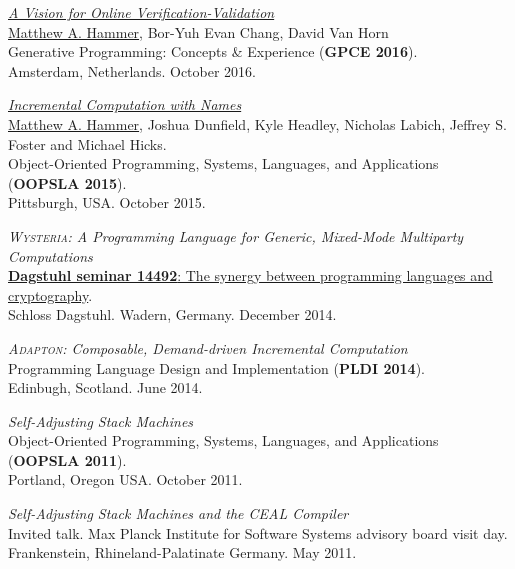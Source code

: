 \documentclass[10pt,letterpaper]{article}
\renewenvironment{itemize}{
  \begin{list}{}{
    \setlength{\leftmargin}{1.5em}
    \setlength{\itemsep}{0.25em}
    \setlength{\parskip}{0pt}
    \setlength{\parsep}{0.25em}
  }
}{
  \end{list}
}
\begin{document}
\begin{itemize}

\item
\href{https://arxiv.org/abs/1608.06012}{\textit{A Vision for Online Verification-Validation}}
\\
\underline{Matthew A. Hammer}, Bor-Yuh Evan Chang, David Van Horn
\\
Generative Programming: Concepts \& Experience (\textbf{GPCE 2016}).
\\
Amsterdam, Netherlands. October 2016.

\item
\href{http://arxiv.org/abs/1503.07792}
{\textit{Incremental Computation with Names}}
\\
\underline{Matthew A. Hammer}, Joshua Dunfield, Kyle Headley, Nicholas Labich,
Jeffrey S. Foster and Michael Hicks.
\\
Object-Oriented Programming, Systems, Languages, and Applications
(\textbf{OOPSLA 2015}).
\\
Pittsburgh, USA. October 2015.

\item
{\textit{\textsc{Wysteria}: A Programming Language for Generic, Mixed-Mode Multiparty Computations}}
\\
\href{http://www.dagstuhl.de/en/program/calendar/semhp/?semnr=14492}
{\textbf{Dagstuhl seminar 14492}: The synergy between programming languages and cryptography}.
\\
Schloss Dagstuhl. Wadern, Germany. December 2014.

\item
{\textit{\textsc{Adapton}: Composable, Demand-driven Incremental Computation}}
\\
Programming Language Design and Implementation (\textbf{PLDI 2014}).
\\
Edinbugh, Scotland. June 2014.

\item \textit{Self-Adjusting Stack Machines}
\\
Object-Oriented Programming, Systems, Languages, and Applications
(\textbf{OOPSLA 2011}).
\\
Portland, Oregon USA. October 2011.

\item \textit{Self-Adjusting Stack Machines and the CEAL Compiler}
\\
Invited talk.  Max Planck Institute for Software Systems
advisory board visit day.
\\
Frankenstein, Rhineland-Palatinate Germany. May 2011.


\end{itemize}
\end{document}
